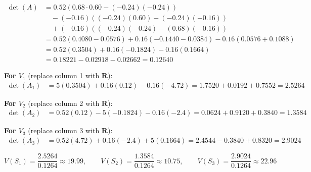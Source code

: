 \documentclass[12pt]{article}
\begin{document}
\begin{enumerate}[label=(\alph*)]
\begin{stepbox}[Step 1: Determinant of $A = \mathbf{I} - 0.8\mathcal{P}$]
\begin{align*}
\det(A) &= 0.52(0.68 \cdot 0.60 - (-0.24)(-0.24)) \\
        &\quad - (-0.16)((-0.24)(0.60) - (-0.24)(-0.16)) \\
        &\quad + (-0.16)((-0.24)(-0.24) - (0.68)(-0.16)) \\
        &= 0.52(0.4080 - 0.0576) + 0.16(-0.1440 - 0.0384) - 0.16(0.0576 + 0.1088) \\
        &= 0.52(0.3504) + 0.16(-0.1824) - 0.16(0.1664) \\
        &= 0.18221 - 0.02918 - 0.02662 = \mathbf{0.12640}
\end{align*}
\end{stepbox}

\begin{stepbox}
\textbf{For $V_1$} (replace column 1 with $\mathbf{R}$):
\begin{align*}
\det(A_1) &= 5(0.3504) + 0.16(0.12) - 0.16(-4.72)
          = 1.7520 + 0.0192 + 0.7552 = \mathbf{2.5264}
\end{align*}

\textbf{For $V_2$} (replace column 2 with $\mathbf{R}$):
\begin{align*}
\det(A_2) &= 0.52(0.12) - 5(-0.1824) - 0.16(-2.4)
          = 0.0624 + 0.9120 + 0.3840 = \mathbf{1.3584}
\end{align*}

\textbf{For $V_3$} (replace column 3 with $\mathbf{R}$):
\begin{align*}
\det(A_3) &= 0.52(4.72) + 0.16(-2.4) + 5(0.1664)
          = 2.4544 - 0.3840 + 0.8320 = \mathbf{2.9024}
\end{align*}
\end{stepbox}

\begin{resultsbox}
\[
\boxed{V(S_1) = \frac{2.5264}{0.1264} \approx 19.99}, \qquad
\boxed{V(S_2) = \frac{1.3584}{0.1264} \approx 10.75}, \qquad
\boxed{V(S_3) = \frac{2.9024}{0.1264} \approx 22.96}
\]
\end{resultsbox}

\end{enumerate}

\end{document}
